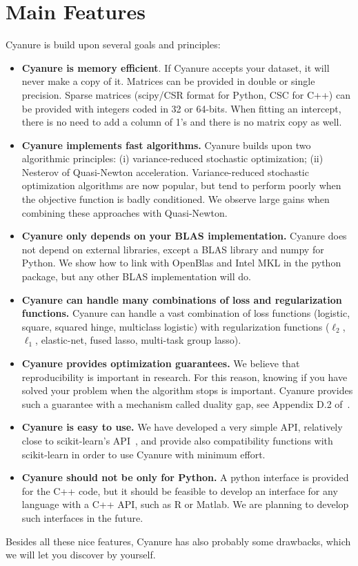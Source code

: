 \documentclass{article}
\begin{document}
\section{Main Features}
Cyanure is build upon several goals and principles:
\begin{itemize}
   \item {\textbf{Cyanure is memory efficient}}. If Cyanure accepts your dataset, it will never make a copy of it. Matrices can be provided in double or single precision. Sparse matrices (scipy/CSR format for Python, CSC for C++)
      can be provided with integers coded in 32 or 64-bits. When fitting an intercept, there is no need to add a column of 1's and there is no matrix copy as well. 
   \item {\textbf{Cyanure implements fast algorithms.}} Cyanure builds upon two algorithmic principles: (i) variance-reduced stochastic optimization; (ii) Nesterov of Quasi-Newton acceleration. Variance-reduced stochastic optimization algorithms are now popular, but tend to perform poorly when the objective function is badly conditioned. We observe large gains when combining these approaches with Quasi-Newton. 
   \item {\textbf{Cyanure only depends on your BLAS implementation.}} Cyanure does not depend on external libraries, except a BLAS library and numpy for Python. We show how to link with OpenBlas and Intel MKL in the python package, but any other BLAS implementation will do.
   \item {\textbf{Cyanure can handle many combinations of loss and regularization functions.}} Cyanure can handle a vast combination of loss functions (logistic, square, squared hinge, multiclass logistic) with regularization functions ($\ell_2$, $\ell_1$, elastic-net, fused lasso, multi-task group lasso).
   \item {\textbf{Cyanure provides optimization guarantees.}} We believe that reproducibility is important in research. For this reason, knowing if you have solved your problem when the algorithm stops is important. Cyanure provides such a guarantee with a mechanism called duality gap, see Appendix D.2 of~\citet{mairal2010sparse}.
   \item {\textbf{Cyanure is easy to use.}} We have developed a very simple API, relatively close to scikit-learn's API~\citep{scikit}, and provide also compatibility functions with scikit-learn in order to use Cyanure with minimum effort.
   \item {\textbf{Cyanure should not be only for Python.}} A python interface is provided for the C++ code, but it should be feasible to develop an interface for any language with a C++ API, such as R or Matlab. We are planning to develop such interfaces in the future.
\end{itemize}
Besides all these nice features, Cyanure has also probably some drawbacks, which we will let you discover by yourself.  
\end{document}
